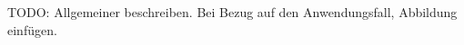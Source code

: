 TODO: Allgemeiner beschreiben. Bei Bezug auf den Anwendungsfall, Abbildung einfügen.





\iffalse
%

